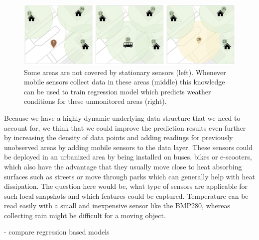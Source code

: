 \begin{figure}[h]
    \centering
    \includegraphics[width=\textwidth]{images/expose-mobile-sensor-deployment.png}
    \caption{Some areas are not covered by stationary sensors (left). Whenever mobile sensors collect data in these areas (middle) this knowledge can be used to train regression model which predicts weather conditions for these unmonitored areas (right).}
    \label{fig:mobile-sensor-deployment}
\end{figure}

Because we have a highly dynamic underlying data structure that we need to account for, we think that we could improve the prediction results even further by increasing the density of data points and adding readings for previously unobserved areas by adding mobile sensors to the data layer. These sensors could be deployed in an urbanized area by being installed on buses, bikes or e-scooters, which also have the advantage that they usually move close to heat absorbing surfaces such as streets or move through parks which can generally help with heat dissipation. The question here would be, what type of sensors are applicable for such local snapshots and which features could be captured. Temperature can be read easily with a small and inexpensive sensor like the BMP280, whereas collecting rain might be difficult for a moving object.

- compare regression based models